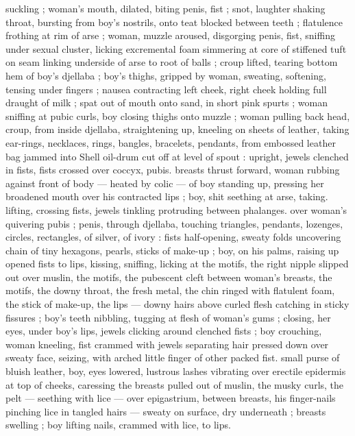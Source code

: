 suckling ; woman's mouth, dilated, biting penis, fist ; snot, laughter 
shaking throat, bursting from boy's nostrils, onto teat blocked 
between teeth ; flatulence frothing at rim of arse ; woman, muzzle 
aroused, disgorging penis, fist, sniffing under sexual cluster, licking 
excremental foam simmering at core of stiffened tuft on seam linking 
underside of arse to root of balls ; croup lifted, tearing bottom hem 
of boy's djellaba ; boy's thighs, gripped by woman, sweating, 
softening, tensing under fingers ; nausea contracting left cheek, right 
cheek holding full draught of milk ; spat out of mouth onto sand, in 
short pink spurts ; woman sniffing at pubic curls, boy closing thighs 
onto muzzle ; woman pulling back head, croup, from inside djellaba, 
straightening up, kneeling on sheets of leather, taking ear-rings, 
necklaces, rings, bangles, bracelets, pendants, from embossed 
leather bag jammed into Shell oil-drum cut off at level of spout : 
upright, jewels clenched in fists, fists crossed over coccyx, pubis. 
breasts thrust forward, woman rubbing against front of body --- 
heated by colic --- of boy standing up, pressing her broadened 
mouth over his contracted lips ; boy, shit seething at arse, taking. 
lifting, crossing fists, jewels tinkling protruding between phalanges. 
over woman's quivering pubis ; penis, through djellaba, touching 
triangles, pendants, lozenges, circles, rectangles, of silver, of ivory : 
fists half-opening, sweaty folds uncovering chain of tiny hexagons, 
pearls, sticks of make-up ; boy, on his palms, raising up opened fists 
to lips, kissing, sniffing, licking at the motifs, the right nipple slipped 
out over muslin, the motifs, the pubescent cleft between woman's 
breasts, the motifs, the downy throat, the fresh metal, the chin ringed 
with flatulent foam, the stick of make-up, the lips --- downy hairs 
above curled flesh catching in sticky fissures ; boy's teeth nibbling, 
tugging at flesh of woman's gums ; closing, her eyes, under boy's 
lips, jewels clicking around clenched fists ; boy crouching, woman 
kneeling, fist crammed with jewels separating hair pressed down over 
sweaty face, seizing, with arched little finger of other packed fist. 
small purse of bluish leather, boy, eyes lowered, lustrous lashes 
vibrating over erectile epidermis at top of cheeks, caressing the 
breasts pulled out of muslin, the musky curls, the pelt --- seething 
with lice --- over epigastrium, between breasts, his finger-nails 
pinching lice in tangled hairs --- sweaty on surface, dry underneath 
; breasts swelling ; boy lifting nails, crammed with lice, to lips. 
